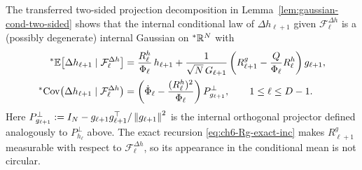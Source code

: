 The transferred two-sided projection decomposition in Lemma~\ref{lem:gaussian-cond-two-sided} shows that the internal conditional law of $\Delta h_{\ell+1}$ given $\mathcal{F}_\ell^{\Delta h}$ is a (possibly degenerate) internal Gaussian on ${}^*\mathbb{R}^N$ with
\begin{equation}
\label{eq:ch6-delta-h-cond-moments}
\begin{aligned}
{}^*\mathbb{E}\bigl[\Delta h_{\ell+1} \mid \mathcal{F}_\ell^{\Delta h}\bigr]
&= \frac{R_\ell^h}{\Phi_\ell}\,h_{\ell+1} + \frac{1}{\sqrt{N}\,G_{\ell+1}}\left(R_{\ell+1}^g - \frac{Q}{\Phi_\ell} R_\ell^h\right) g_{\ell+1}, \\
{}^*\!\operatorname{Cov}\bigl(\Delta h_{\ell+1} \mid \mathcal{F}_\ell^{\Delta h}\bigr)
&= \left(\dot{\Phi}_\ell - \frac{(R_\ell^h)^2}{\Phi_\ell}\right) P_{g_{\ell+1}}^\perp, \qquad 1 \le \ell \le D - 1.
\end{aligned}
\end{equation}
Here $P_{g_{\ell+1}}^\perp := I_N - g_{\ell+1} g_{\ell+1}^\top / \left\lVert g_{\ell+1} \right\rVert^2$ is the internal orthogonal projector defined analogously to $P_{h_\ell}^\perp$ above. The exact recursion \eqref{eq:ch6-Rg-exact-inc} makes $R_{\ell+1}^g$ measurable with respect to $\mathcal{F}_\ell^{\Delta h}$, so its appearance in the conditional mean is not circular.

